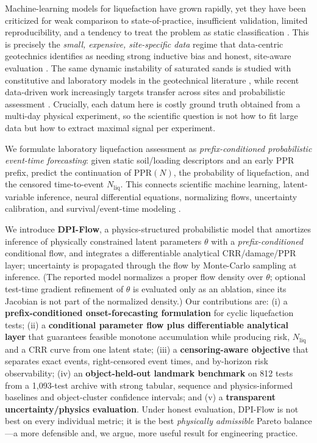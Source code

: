 \documentclass[letterpaper]{article} %
\begin{document}
Machine-learning models for liquefaction have grown rapidly, yet they have been criticized for weak
comparison to state-of-practice, insufficient validation, limited reproducibility, and a tendency to
treat the problem as static classification \citep{maurer23,jas23,sanger25}. This is precisely the
\emph{small, expensive, site-specific data} regime that data-centric geotechnics identifies as needing
strong inductive bias and honest, site-aware evaluation \citep{phoon22,baghbani22}. The same dynamic
instability of saturated sands is studied with constitutive and laboratory models in the geotechnical
literature \citep{termart25,termart23,sidorov24}, while recent data-driven work increasingly targets
transfer across sites and probabilistic assessment \citep{guotransfer25,demir24}. Crucially, each
datum here is costly ground truth obtained from a multi-day physical experiment, so the scientific
question is not how to fit large data but how to extract maximal signal per experiment.

We formulate laboratory liquefaction assessment as \emph{prefix-conditioned probabilistic event-time
forecasting}: given static soil/loading descriptors and an early PPR prefix, predict the continuation of
$\mathrm{PPR}(N)$, the probability of liquefaction, and the censored time-to-event $N_{\mathrm{liq}}$.
This connects scientific machine learning, latent-variable inference, neural differential equations,
normalizing flows, uncertainty calibration, and survival/event-time modeling
\citep{karniadakis21,chen18,latentnode22,rezende15,guo17,romano19,cuqds25,davis06,abdar21,cox72}.

We introduce \textbf{DPI-Flow}, a physics-structured probabilistic model that amortizes inference of
physically constrained latent parameters $\theta$ with a \emph{prefix-conditioned} conditional flow, and
integrates a differentiable analytical CRR/damage/PPR layer; uncertainty is propagated through the flow
by Monte-Carlo sampling at inference. (The reported model normalizes a proper flow density over
$\theta$; optional test-time gradient refinement of $\theta$ is evaluated only as an ablation, since its
Jacobian is not part of the normalized density.) Our contributions are: (i) a \textbf{prefix-conditioned
onset-forecasting formulation} for cyclic liquefaction tests; (ii) a \textbf{conditional parameter flow
plus differentiable analytical layer} that guarantees feasible monotone accumulation while producing
risk, $N_{\mathrm{liq}}$ and a CRR curve from one latent state; (iii) a \textbf{censoring-aware
objective} that separates exact events, right-censored event times, and by-horizon risk observability;
(iv) an \textbf{object-held-out landmark benchmark} on 812 tests from a 1{,}093-test archive with strong tabular, sequence and
physics-informed baselines and object-cluster confidence intervals; and (v) a \textbf{transparent
uncertainty/physics evaluation}. Under honest evaluation, DPI-Flow is not best on every individual metric;
it is the best \emph{physically admissible} Pareto balance---a more defensible and, we argue, more useful
result for engineering practice.
\end{document}
